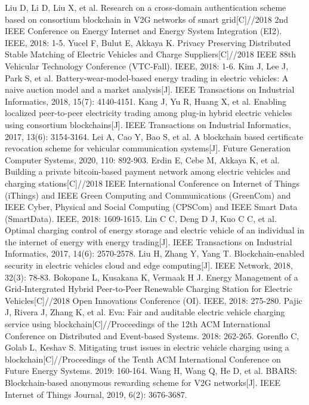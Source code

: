 \begin{thebibliography}{99}
 Liu D, Li D, Liu X, et al. Research on a cross-domain authentication scheme based on consortium blockchain in V2G networks of smart grid[C]//2018 2nd IEEE Conference on Energy Internet and Energy System Integration (EI2). IEEE, 2018: 1-5.
 Yucel F, Bulut E, Akkaya K. Privacy Preserving Distributed Stable Matching of Electric Vehicles and Charge Suppliers[C]//2018 IEEE 88th Vehicular Technology Conference (VTC-Fall). IEEE, 2018: 1-6.
 Kim J, Lee J, Park S, et al. Battery-wear-model-based energy trading in electric vehicles: A naive auction model and a market analysis[J]. IEEE Transactions on Industrial Informatics, 2018, 15(7): 4140-4151.
 Kang J, Yu R, Huang X, et al. Enabling localized peer-to-peer electricity trading among plug-in hybrid electric vehicles using consortium blockchains[J]. IEEE Transactions on Industrial Informatics, 2017, 13(6): 3154-3164.
 Lei A, Cao Y, Bao S, et al. A blockchain based certificate revocation scheme for vehicular communication systems[J]. Future Generation Computer Systems, 2020, 110: 892-903.
 Erdin E, Cebe M, Akkaya K, et al. Building a private bitcoin-based payment network among electric vehicles and charging stations[C]//2018 IEEE International Conference on Internet of Things (iThings) and IEEE Green Computing and Communications (GreenCom) and IEEE Cyber, Physical and Social Computing (CPSCom) and IEEE Smart Data (SmartData). IEEE, 2018: 1609-1615.
 Lin C C, Deng D J, Kuo C C, et al. Optimal charging control of energy storage and electric vehicle of an individual in the internet of energy with energy trading[J]. IEEE Transactions on Industrial Informatics, 2017, 14(6): 2570-2578.
 Liu H, Zhang Y, Yang T. Blockchain-enabled security in electric vehicles cloud and edge computing[J]. IEEE Network, 2018, 32(3): 78-83.
 Bokopane L, Kusakana K, Vermaak H J. Energy Management of a Grid-Intergrated Hybrid Peer-to-Peer Renewable Charging Station for Electric Vehicles[C]//2018 Open Innovations Conference (OI). IEEE, 2018: 275-280.
 Pajic J, Rivera J, Zhang K, et al. Eva: Fair and auditable electric vehicle charging service using blockchain[C]//Proceedings of the 12th ACM International Conference on Distributed and Event-based Systems. 2018: 262-265.
 Gorenflo C, Golab L, Keshav S. Mitigating trust issues in electric vehicle charging using a blockchain[C]//Proceedings of the Tenth ACM International Conference on Future Energy Systems. 2019: 160-164.
 Wang H, Wang Q, He D, et al. BBARS: Blockchain-based anonymous rewarding scheme for V2G networks[J]. IEEE Internet of Things Journal, 2019, 6(2): 3676-3687.

\end{thebibliography}

